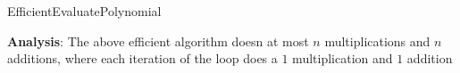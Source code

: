 \begin{parts}
\begin{customsolutionbox}
        \begin{algorithm}[H]
            \SetAlgoLined
            \caption{EfficientEvaluatePolynomial}
        \end{algorithm}
        \textbf{Analysis}: The above efficient algorithm doesn at most $n$ multiplications and $n$ additions, where each iteration of the loop does a $1$ 
        multiplication and $1$ addition
    \end{customsolutionbox}
\end{parts}